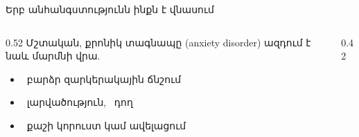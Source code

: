 \begin{frame}{Երբ անհանգստությունն ինքն է վնասում}
  \begin{columns}[c]
    \begin{column}{0.52\textwidth}
      Մշտական, քրոնիկ տագնապը (anxiety disorder) ազդում է նաև մարմնի վրա.\par\smallskip
      \begin{itemize}
        \item<2-> \ բարձր զարկերակային ճնշում
        \item<2-> \ լարվածություն, \ դող
        \item<2-> \ քաշի կորուստ կամ ավելացում
      \end{itemize}
    \end{column}
    \begin{column}{0.42\textwidth}
    \end{column}
  \end{columns}
\end{frame}

